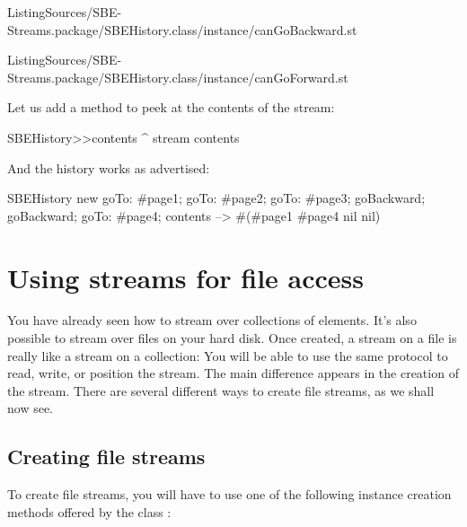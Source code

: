 \documentclass[a4paper,10pt,twoside]{book}
\begin{document}
\numFiletreeMethodInput[sbehistorycangobackward]%
{}%
{ListingSources/SBE-Streams.package/SBEHistory.class/instance/canGoBackward.st}

\numFiletreeMethodInput[sbehistorycangoforward]%
{}%
{ListingSources/SBE-Streams.package/SBEHistory.class/instance/canGoForward.st}

Let us add a method to peek at the contents of the stream:
\begin{code}{}
SBEHistory>>contents
	^ stream contents
\end{code}

And the history works as advertised:
\begin{code}{}
SBEHistory new
	goTo: #page1;
	goTo: #page2;
	goTo: #page3;
	goBackward;
	goBackward;
	goTo: #page4;
	contents --> #(#page1 #page4 nil nil)
\end{code}

\section{Using streams for file access}

You have already seen how to stream over collections of elements.
It's also possible to stream over files on your hard disk.
Once created, a stream on a file is really like a stream on a collection:
You will be able to use the same protocol to read, write, or position the stream.
The main difference appears in the creation of the stream.
There are several different ways to create file streams, as we shall now see.

\subsection{Creating file streams}
\label{sec:creat-file-stre}

To create file streams, you will have to use one of the following instance creation methods offered by the class :
\end{document}
